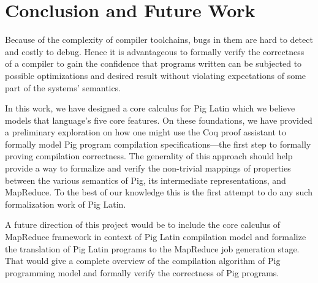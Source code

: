 \section{Conclusion and Future Work}
\label{sec:conclusion}

Because of the complexity of compiler toolchains, bugs in them are hard to detect and costly to debug. Hence it is advantageous to formally verify the correctness of a compiler to gain the confidence that programs written can be subjected to possible optimizations and desired result without violating expectations of some part of the systems' semantics.

In this work, we have designed a core calculus for Pig Latin which we believe models that language's five core features. On these foundations, we have provided a preliminary exploration on how one might use the Coq proof assistant to formally model Pig program compilation specifications---the first step to formally proving compilation correctness. The generality of this approach should help provide a way to formalize and verify the non-trivial mappings of properties between the various semantics of Pig, its intermediate representations, and MapReduce. To the best of our knowledge this is the first attempt to do any such formalization work of Pig Latin.

A future direction of this project would be to include the core calculus of MapReduce framework in context of Pig Latin compilation model and formalize the translation of Pig Latin programs to the MapReduce job generation stage. That would give a complete overview of the compilation algorithm of Pig programming model and formally verify the correctness of Pig programs.
